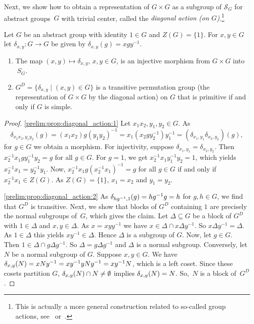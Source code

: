 Next, we show how to obtain a representation of $G \times G$
as a subgroup of $\mathcal S_G$ for abstract groups~$G$
with trivial center, called the \emph{diagonal action (on $G$)}.\footnote{This is actually a more general
construction related to so-called group actions, see~\cite[Example~2.6]{ArCamSt2017} or~\cite[Exercise~1.6]{cameron_1999}.} 

\label{def:diagonal-action}
\begin{proposition}
\label{prelim:prop:diagonal_action}
Let $G$ be an abstract group with identity $1 \in G$ and $Z(G) = \{1\}$.
For $x,y \in G$ let $\delta_{x,y} \colon G \to G$
be given by $\delta_{x,y}(g) = xgy^{-1}$.
	
\begin{enumerate}
\item \label{prelim:prop:diagonal_action:1} The map $(x,y) \mapsto \delta_{x,y}$, $x,y \in G$, 
 is an injective morphism from $G\times G$
 into $\mathcal~S_G$.

\item \label{prelim:prop:diagonal_action:2} $G^D = \{ \delta_{x,y} \mid (x,y) \in G\}$ is a transitive permutation group (the representation of $G \times G$ by the diagonal action) on $G$ that is primitive if and only if $G$ is simple.
\end{enumerate}
\end{proposition}
\begin{proof}
\ref{prelim:prop:diagonal_action:1} 
 Let $x_1 x_2, y_1, y_2 \in G$.
 As 
 \[
 \delta_{x_1 x_2, y_1 y_2}(g) = (x_1 x_2) g (y_1 y_2)^{-1} = x_1( x_2 g y_2^{-1}) y_1^{-1} = ( \delta_{x_1,y_1} \delta_{x_2,y_2} )(g),
 \]
 for $g \in G$ we obtain a morphism.
 For injectivity, suppose $\delta_{x_1,y_1} = \delta_{x_2, y_2}$.
 Then $x_2^{-1} x_1 g y_1^{-1} y_2 = g$
for all $g\in G$. For $g = 1$,
we get $x_2^{-1} x_1 y_1^{-1} y_2 = 1$,
which yields $x_2^{-1} x_1 = y_2^{-1} y_1$.
Now, $x_2^{-1} x_1 g (x_2^{-1} x_1)^{-1} = g$ for all $g \in G$
if and only if $x_2^{-1} x_1 \in Z(G)$.
As $Z(G) = \{1\}$, $x_1 = x_2$
and $y_1 = y_2$.
	
\ref{prelim:prop:diagonal_action:2} As $\applyfunc{g}{\delta_{hg^{-1},1}} = hg^{-1}g = h$
for $g,h \in G$, we find that $G^D$ is transitive.
Next, we show that blocks of $G^D$ containing $1$
are precisely the normal subgroups of~$G$, which gives the claim.
Let $\Delta \subseteq G$ be a block of $G^D$ with $1 \in \Delta$ and $x,y \in \Delta$.
As $x = xyy^{-1}$ we have $x \in \Delta \cap x\Delta y^{-1}$.
So $x\Delta y^{-1} = \Delta$.
As $1 \in \Delta$ this yields $xy^{-1} \in \Delta$.
Hence $\Delta$ is a subgroup of $G$.
Now, let $g \in G$.
Then $1 \in \Delta \cap g\Delta g^{-1}$.
So $\Delta = g\Delta g^{-1}$
and $\Delta$ is a normal subgroup.
Conversely, let $N$ be a normal subgroup of $G$.
Suppose $x,y \in G$. We have $\applyfunc{N}{\delta_{x,y}} = 
x N y^{-1} = x y^{-1} y N y^{-1} = x y^{-1} N$, which is a left coset.
Since these cosets partition $G$, $\applyfunc{N}{\delta_{x,y}} \cap N \ne \emptyset$
implies $\applyfunc{N}{\delta_{x,y}} = N$.
So,~$N$ is a block of~$G^D$.
\end{proof}

